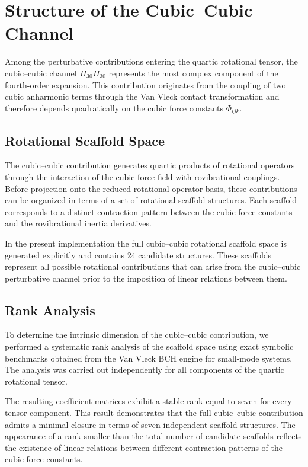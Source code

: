\documentclass[aip,jcp,reprint]{revtex4-2}
\begin{document}
\section{Structure of the Cubic--Cubic Channel}

Among the perturbative contributions entering the quartic rotational tensor,
the cubic--cubic channel $H_{30}H_{30}$ represents the most complex
component of the fourth-order expansion.
This contribution originates from the coupling of two cubic anharmonic
terms through the Van Vleck contact transformation and therefore depends
quadratically on the cubic force constants $\Phi_{ijk}$.

\subsection{Rotational Scaffold Space}

The cubic--cubic contribution generates quartic products of rotational
operators through the interaction of the cubic force field with
rovibrational couplings.
Before projection onto the reduced rotational operator basis,
these contributions can be organized in terms of a set of rotational
scaffold structures.
Each scaffold corresponds to a distinct contraction pattern between
the cubic force constants and the rovibrational inertia derivatives.

In the present implementation the full cubic--cubic rotational scaffold
space is generated explicitly and contains 24 candidate structures.
These scaffolds represent all possible rotational contributions that
can arise from the cubic--cubic perturbative channel prior to the
imposition of linear relations between them.

\subsection{Rank Analysis}

To determine the intrinsic dimension of the cubic--cubic contribution,
we performed a systematic rank analysis of the scaffold space using
exact symbolic benchmarks obtained from the Van Vleck BCH engine for
small-mode systems.
The analysis was carried out independently for all components of the
quartic rotational tensor.

The resulting coefficient matrices exhibit a stable rank equal to seven
for every tensor component. This result demonstrates that the full
cubic--cubic contribution admits a minimal closure in terms of seven
independent scaffold structures. The appearance of a rank smaller than
the total number of candidate scaffolds reflects the existence of linear
relations between different contraction patterns of the cubic force
constants.
\end{document}
